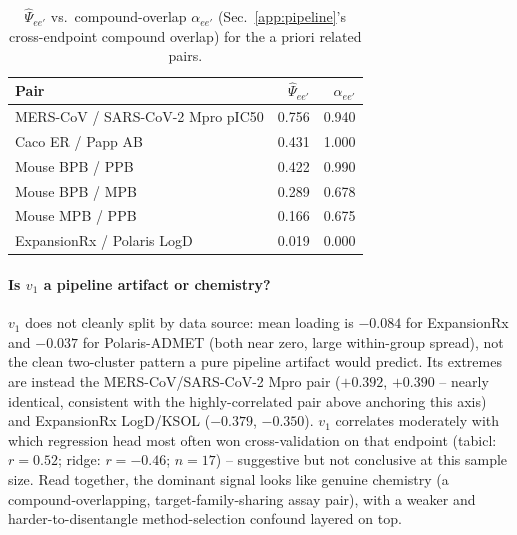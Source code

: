 \documentclass{article}
\begin{document}
\begin{table}[H]
\centering
\caption{$\hat\Psi_{ee'}$ vs.\ compound-overlap $\alpha_{ee'}$ (Sec.~\ref{app:pipeline}'s cross-endpoint
compound overlap) for the a priori related pairs.}
\label{tab:endpoint-psi-alpha}
\begin{tabular}{lrr}
\toprule
Pair & $\hat\Psi_{ee'}$ & $\alpha_{ee'}$ \\
\midrule
MERS-CoV / SARS-CoV-2 Mpro pIC50   & 0.756 & 0.940 \\
Caco ER / Papp AB                  & 0.431 & 1.000 \\
Mouse BPB / PPB                    & 0.422 & 0.990 \\
Mouse BPB / MPB                    & 0.289 & 0.678 \\
Mouse MPB / PPB                    & 0.166 & 0.675 \\
ExpansionRx / Polaris LogD         & 0.019 & 0.000 \\
\bottomrule
\end{tabular}
\end{table}

\paragraph{Is $v_1$ a pipeline artifact or chemistry?} $v_1$ does not cleanly split by data source: mean
loading is $-0.084$ for ExpansionRx and $-0.037$ for Polaris-ADMET (both near zero, large within-group spread),
not the clean two-cluster pattern a pure pipeline artifact would predict. Its extremes are instead the MERS-CoV/SARS-CoV-2
Mpro pair ($+0.392$, $+0.390$ -- nearly identical, consistent with the highly-correlated pair above anchoring
this axis) and ExpansionRx LogD/KSOL ($-0.379$, $-0.350$). $v_1$ correlates moderately with which regression
head most often won cross-validation on that endpoint (tabicl: $r=0.52$; ridge: $r=-0.46$; $n=17$) -- suggestive
but not conclusive at this sample size. Read together, the dominant signal looks like genuine chemistry (a
compound-overlapping, target-family-sharing assay pair), with a weaker and harder-to-disentangle
method-selection confound layered on top.
\end{document}
